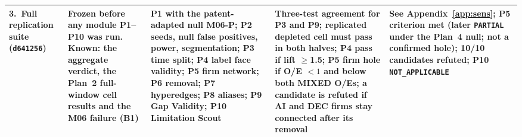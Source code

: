 \begin{table}[tbp]
\begin{tabular}{p{2.0cm}p{2.5cm}p{3.7cm}p{4.3cm}p{2.3cm}}
\addlinespace
\raggedright 3.~Full replication suite (\texttt{d641256}) &
\raggedright Frozen before any module P1--P10 was run. Known: the aggregate verdict, the Plan~2 full-window cell results and the M06 failure (B1) &
\raggedright P1 with the patent-adapted null M06-P; P2 seeds, null false positives, power, segmentation; P3 time split; P4 label face validity; P5 firm network; P6 removal; P7 hyperedges; P8 aliases; P9 Gap Validity; P10 Limitation Scout &
\raggedright Three-test agreement for P3 and P9; replicated depleted cell must pass in both halves; P4 pass if lift $\geq$1.5; P5 firm hole if O/E $<1$ and below both MIXED O/Es; a candidate is refuted if AI and DEC firms stay connected after its removal &
\raggedright See Appendix~\ref{app:sens}; P5 criterion met (later \texttt{PARTIAL} under the Plan~4 null; not a confirmed hole); 10/10 candidates refuted; P10 \texttt{NOT\_\allowbreak APPLICABLE} \tabularnewline
\bottomrule
\end{tabular}
\end{table}

